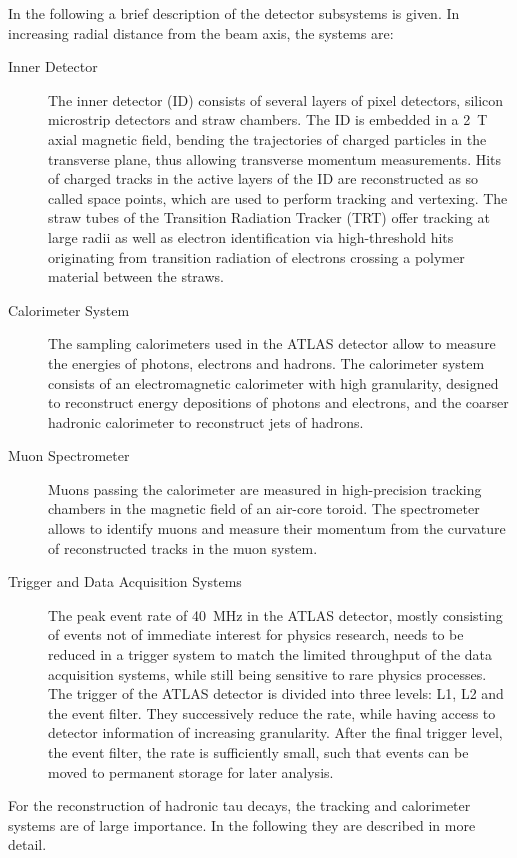 In the following a brief description of the detector subsystems is given. In
increasing radial distance from the beam axis, the systems are:
\begin{description}
\item[Inner Detector] The inner detector (ID) consists of several layers of
  pixel detectors, silicon microstrip detectors and straw chambers. The ID is
  embedded in a \SI{2}{\tesla} axial magnetic field, bending the trajectories of
  charged particles in the transverse plane, thus allowing transverse momentum
  measurements. Hits of charged tracks in the active layers of the ID are
  reconstructed as so called space points, which are used to perform tracking
  and vertexing. The straw tubes of the Transition Radiation Tracker (TRT) offer
  tracking at large radii as well as electron identification via high-threshold
  hits originating from transition radiation of electrons crossing a polymer
  material between the straws.

\item[Calorimeter System] The sampling calorimeters used in the ATLAS detector
  allow to measure the energies of photons, electrons and hadrons. The
  calorimeter system consists of an electromagnetic calorimeter with high
  granularity, designed to reconstruct energy depositions of photons and
  electrons, and the coarser hadronic calorimeter to reconstruct jets of
  hadrons.

\item[Muon Spectrometer] Muons passing the calorimeter are measured in
  high-precision tracking chambers in the magnetic field of an air-core toroid.
  The spectrometer allows to identify muons and measure their momentum from the
  curvature of reconstructed tracks in the muon system.

\item[Trigger and Data Acquisition Systems] The peak event rate of
  \SI{40}{\mega\hertz} in the ATLAS detector, mostly consisting of events not of
  immediate interest for physics research, needs to be reduced in a trigger
  system to match the limited throughput of the data acquisition systems, while
  still being sensitive to rare physics processes. The trigger of the ATLAS
  detector is divided into three levels: L1, L2 and the event filter. They
  successively reduce the rate, while having access to detector information of
  increasing granularity. After the final trigger level, the event filter, the
  rate is sufficiently small, such that events can be moved to permanent storage
  for later analysis.
\end{description}
For the reconstruction of hadronic tau decays, the tracking and calorimeter
systems are of large importance. In the following they are described in more
detail.

